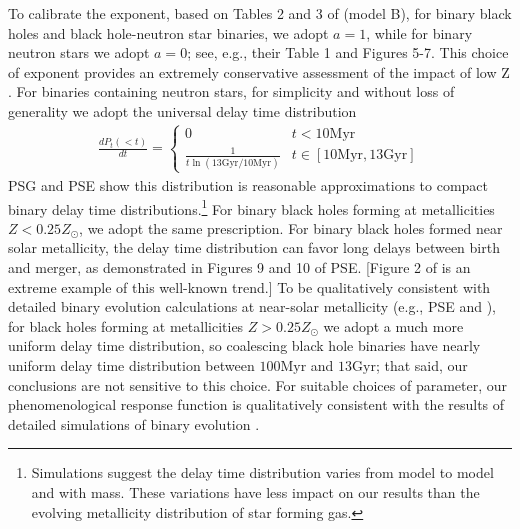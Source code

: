 \documentclass[a4paper,fleqn,usenatbib]{mnras}
\newcommand\unit[1]{\text{#1}}
\newcommand\abbrvPSgrb{PSG}
\newcommand\abbrvPSellipticals{PSE}
\begin{document}
To calibrate the exponent, based on Tables 2 and 3 of
\cite{popsyn-LowMetallicityImpact2-StarTrackRevised-2012} (model B), for binary black holes and black hole-neutron star
binaries, we adopt $a=1$, while for binary neutron stars we adopt $a=0$; see, e.g., their Table 1 and Figures
5-7. This choice of exponent provides an extremely conservative assessment of the impact of low Z
\cite[see,e.g.,][]{2012CQGra..29n5011O,gwastro-EventPopsynPaper-2016}. 
%
For binaries containing neutron stars, for simplicity and without loss of generality we adopt the universal delay time distribution
\begin{eqnarray}
\frac{dP_t(<t)}{dt} =  \begin{cases}
0 & t<10 \unit{Myr} \\
\frac{1}{t \ln (13 \unit{Gyr}/10\unit{Myr})} & t \in [10\unit{Myr},13\unit{Gyr}]
\end{cases} 
\end{eqnarray}
\abbrvPSgrb{} and \abbrvPSellipticals{} show this distribution is reasonable approximations to compact binary delay
time distributions.\footnote{Simulations suggest the delay time distribution varies from model to model and with mass.
  These variations have less impact on our results than the evolving metallicity distribution of star forming gas.}
%
For binary black holes forming at metallicities $Z<0.25 Z_\odot$, we adopt the same prescription.  
For binary black holes formed near solar metallicity, the delay time distribution can favor long delays between birth
and merger, as demonstrated in Figures 9 and 10 of \abbrvPSellipticals{}.  [Figure 2 of  \cite{2016arXiv160508783L} is
  an extreme example of this well-known trend.] 
To be qualitatively consistent with detailed binary evolution calculations at near-solar metallicity (e.g., \abbrvPSellipticals{} and
\cite{gwastro-EventPopsynPaper-2016}), for 
black holes forming at metallicities $Z>0.25 Z_\odot$ we adopt a much more uniform delay time distribution, so 
coalescing black hole binaries have nearly uniform delay time distribution between $100\unit{Myr}$ and
$13\unit{Gyr}$; that said,  our conclusions are not sensitive to this choice.
%
For suitable choices of parameter, our phenomenological response function is qualitatively consistent with the results of detailed simulations of binary
evolution  \citep{2010ApJ...715L.138B,popsyn-LowMetallicityImpact2c-StarTrackRevised-2014,popsyn-LowMetallicityImpact2b-StarTrackRevised-2013,popsyn-LowMetallicityImpact2-StarTrackRevised-2012}.
\end{document}

